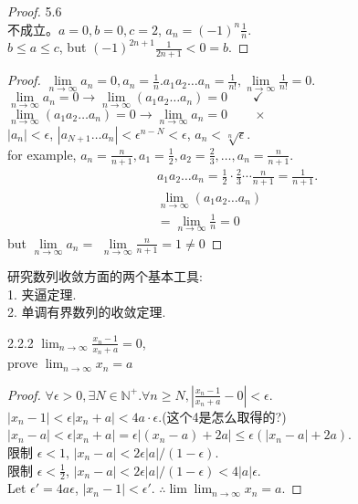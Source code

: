 \begin{proof}5.6\\
	不成立。$ a=0,b=0,c=2 $, $ a_n = (-1)^n\frac{1}{n} $.\\
	$ b\leqslant a\leqslant c $, but $ (-1)^{2n+1}\frac{1}{2n+1}<0=b $.
\end{proof}
\begin{proof}
	$ \lim\limits_{n\rightarrow\infty}a_n=0, a_n = \frac{1}{n} $.$ a_1a_2\dots a_n = \frac{1}{n!}, \lim\limits_{n\rightarrow\infty}\frac{1}{n!}=0 $.\\
	$ \lim\limits_{n\rightarrow\infty}a_n=0 \rightarrow \lim\limits_{n\rightarrow\infty}(a_1a_2\dots a_n)=0 \qquad\checkmark$\\
	$ \lim\limits_{n\rightarrow\infty}(a_1a_2\dots a_n)=0 \rightarrow \lim\limits_{n\rightarrow\infty}a_n=0 \qquad\times$\\
	$ |a_n|<\epsilon $, $ |a_{N+1}\dots a_n|<\epsilon^{n-N}<\epsilon $,	$ a_n <\sqrt[n]{\epsilon} $.\\
	for example, $ a_n = \frac{n}{n+1}, a_1 = \frac{1}{2}, a_2=\frac{2}{3},\dots,a_n=\frac{n}{n+1} $.\\
	\begin{align*}
	 a_1a_2\dots a_n = \frac{1}{2}\cdot\frac{2}{3}\cdots\frac{n}{n+1} = \frac{1}{n+1} . \\
	\lim\limits_{n\rightarrow\infty}
	(a_1a_2\dots a_n) \\=  
	\lim\limits_{n\rightarrow\infty}
	\frac{1}{n}
	=0
\end{align*}	
but $ 	\lim\limits_{n\rightarrow\infty}a_n=$  $	\lim\limits_{n\rightarrow\infty}
\frac{n}{n+1} = 1 \neq 0  $
\end{proof}

研究数列收敛方面的两个基本工具:\\
1. 夹逼定理.\\
2. 单调有界数列的收敛定理.

\begin{example}{2.2.2}
	$ \lim_{n\rightarrow\infty}\frac{x_n-1}{x_n+a} = 0 $, \\
	prove $ \lim_{n\rightarrow\infty}x_n=a $
\end{example}
\begin{proof}
	$\forall \epsilon >0, \exists N \in \mathbb{N}^+. \forall n \geqslant N, |\frac{x_n-1}{x_n+a}- 0| < \epsilon$.\\
	$ |{x_n-1}|< \epsilon|{x_n+a}| < 4a\cdot \epsilon $.(这个4是怎么取得的?)\\
	$ |x_n-a|<\epsilon|x_n+a| = \epsilon|(x_n-a)+2a|\leqslant \epsilon(|x_n-a|+2a) $.\\
	限制 $ \epsilon<1 $, $ |x_n-a|<2\epsilon|a|/(1-\epsilon) $.\\
	限制 $ \epsilon<\frac{1}{2} $, $ |x_n-a|<2\epsilon|a|/(1-\epsilon)<4|a|\epsilon $.\\
	Let $ \epsilon'=4a\epsilon  $, $ |{x_n-1}|<\epsilon' $. $ \therefore \lim\lim_{n\rightarrow\infty}x_n = a $.	
\end{proof}

